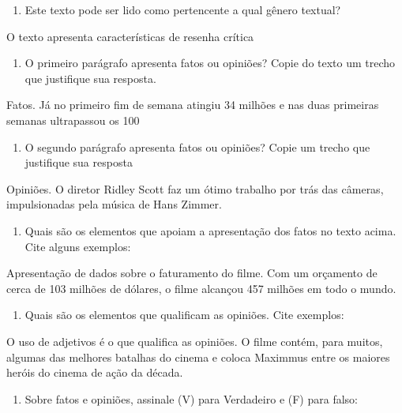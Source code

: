\begin{enumerate}
\def\labelenumi{\arabic{enumi})}
\setcounter{enumi}{3}
\tightlist
\item
  Este texto pode ser lido como pertencente a qual gênero textual?
\end{enumerate}

O texto apresenta características de resenha crítica

\begin{enumerate}
\def\labelenumi{\arabic{enumi})}
\setcounter{enumi}{4}
\tightlist
\item
  O primeiro parágrafo apresenta fatos ou opiniões? Copie do texto um
  trecho que justifique sua resposta.
\end{enumerate}

Fatos. Já no primeiro fim de semana atingiu 34 milhões e nas duas
primeiras semanas ultrapassou os 100

\begin{enumerate}
\def\labelenumi{\arabic{enumi})}
\setcounter{enumi}{5}
\tightlist
\item
  O segundo parágrafo apresenta fatos ou opiniões? Copie um trecho que
  justifique sua resposta
\end{enumerate}

Opiniões. O diretor Ridley Scott faz um ótimo trabalho por trás das
câmeras, impulsionadas pela música de Hans Zimmer.

\begin{enumerate}
\def\labelenumi{\arabic{enumi})}
\setcounter{enumi}{6}
\tightlist
\item
  Quais são os elementos que apoiam a apresentação dos fatos no texto
  acima. Cite alguns exemplos:
\end{enumerate}

Apresentação de dados sobre o faturamento do filme. Com um orçamento de
cerca de 103 milhões de dólares, o filme alcançou 457 milhões em todo o
mundo.

\begin{enumerate}
\def\labelenumi{\arabic{enumi})}
\setcounter{enumi}{7}
\tightlist
\item
  Quais são os elementos que qualificam as opiniões. Cite exemplos:
\end{enumerate}

O uso de adjetivos é o que qualifica as opiniões. O filme contém, para
muitos, algumas das melhores batalhas do cinema e coloca Maximmus entre
os maiores heróis do cinema de ação da década.

\begin{enumerate}
\def\labelenumi{\arabic{enumi})}
\setcounter{enumi}{8}
\tightlist
\item
  Sobre fatos e opiniões, assinale (V) para Verdadeiro e (F) para falso:
\end{enumerate}

